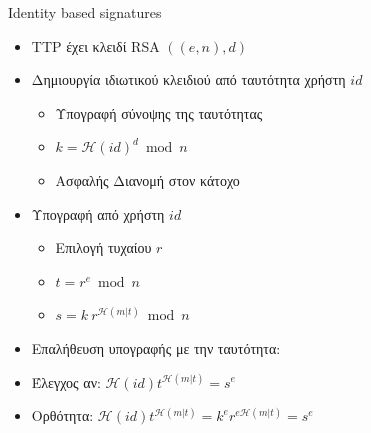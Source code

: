 \documentclass[handout]{beamer}
\begin{document}
\begin{frame}{Identity based signatures}
\begin{itemize}
    \item TTP έχει κλειδί RSA $((e,n),d)$
    \pause
    \item Δημιουργία ιδιωτικού κλειδιού από ταυτότητα χρήστη $id$
    \pause
    \begin{itemize}
        \item Υπογραφή σύνοψης της ταυτότητας 
        \item $k = \mathcal{H}(id)^d \bmod{n}$ 
        \item Ασφαλής Διανομή στον κάτοχο
    \end{itemize}
    \item Υπογραφή από χρήστη $id$
    \pause
    \begin{itemize}
        \item Επιλογή τυχαίου $r$
        \item $t =r^e \bmod{n}$ 
        \item $s =k \ r^{\mathcal{H}(m | t)} \bmod{n}$ 
    \end{itemize}
    \pause
    \item Επαλήθευση υπογραφής με την ταυτότητα:
    \pause
    \item Έλεγχος αν: $\mathcal{H}(id) t^{\mathcal{H}(m|t)} = s^e$
    \pause
    \item Ορθότητα: $\mathcal{H}(id) t^{\mathcal{H}(m|t)} = k^e r^{e\mathcal{H}(m|t)} = s^e$
\end{itemize}
\end{frame}
\end{document}
